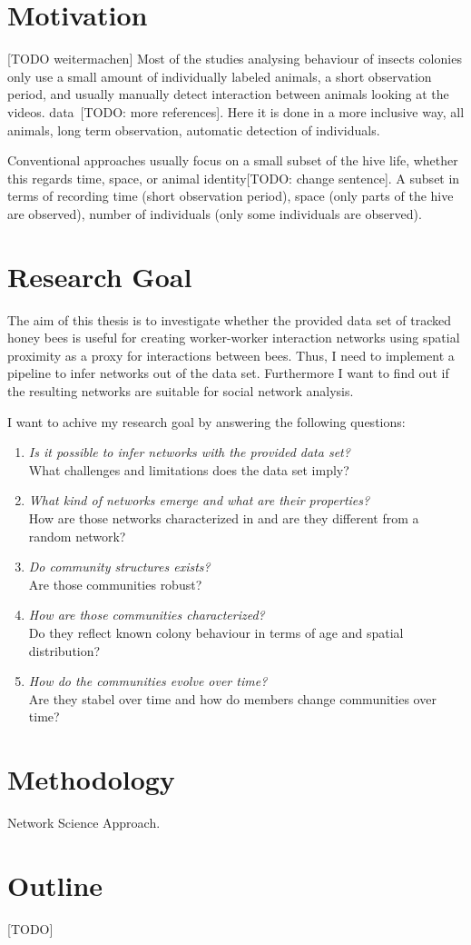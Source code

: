 \section{Motivation}
[TODO weitermachen]
Most of the studies analysing behaviour of insects colonies only use a small amount of individually labeled animals, a short observation period, and usually manually detect interaction between animals looking at the videos. data~\cite{quevillon2015social}[TODO: more references]. Here it is done in a more inclusive way, all animals, long term observation, automatic detection of individuals.

Conventional approaches usually focus on a small subset of the hive life, whether this regards time, space, or animal identity[TODO: change sentence]. A subset in terms of recording time (short observation period), space (only parts of the hive are observed), number of individuals (only some individuals are observed). 


\section{Research Goal}

The aim of this thesis is to investigate whether the provided data set of tracked honey bees is useful for creating worker-worker interaction networks using spatial proximity as a proxy for interactions between bees. Thus, I need to implement a pipeline to infer networks out of the data set. Furthermore I want to find out if the resulting networks are suitable for social network analysis.

I want to achive my research goal by answering the following questions:

\begin{enumerate}
\item \emph{Is it possible to infer networks with the provided data set?}\\
What challenges and limitations does the data set imply?
\item \emph{What kind of networks emerge and what are their properties?}\\
How are those networks characterized in and are they different from a random network?
\item \emph{Do community structures exists?}\\
Are those communities robust?
\item \emph{How are those communities characterized?}\\
Do they reflect known colony behaviour in terms of age and spatial distribution?
\item \emph{How do the communities evolve over time?}\\
Are they stabel over time and how do members change communities over time?

\end{enumerate}


\section{Methodology}

Network Science Approach.

\section{Outline}
[TODO]